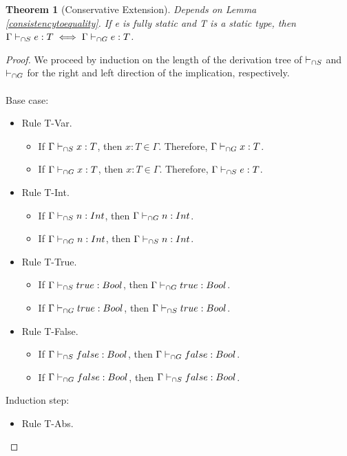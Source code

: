 \documentclass[a4paper]{article}
\newtheorem{theorem}{Theorem}
\begin{document}
\begin{theorem}[Conservative Extension]
\label{conservative_extension_typesystem}
Depends on Lemma \ref{consistencytoequality}.
If e is fully static and T is a static type, then $\Gamma \vdash_{\cap S} e : T \iff \Gamma \vdash_{\cap G} e : T$.
\end{theorem}
\begin{proof}
We proceed by induction on the length of the derivation tree of $\vdash_{\cap S}$ and $\vdash_{\cap G}$ for the right and left direction of the implication, respectively.\\\\
Base case:
\begin{itemize}
    \item Rule T-Var.
    \begin{itemize}
        \item If $\Gamma \vdash_{\cap S} x : T$, then $x : T \in \Gamma$.
        Therefore, $\Gamma \vdash_{\cap G} x : T$.
        \item If $\Gamma \vdash_{\cap G} x : T$, then $x : T \in \Gamma$.
        Therefore, $\Gamma \vdash_{\cap S} e : T$.
    \end{itemize}
    \item Rule T-Int.
    \begin{itemize}
        \item If $\Gamma \vdash_{\cap S} n : {Int}$, then $\Gamma \vdash_{\cap G} n : {Int}$.
        \item If $\Gamma \vdash_{\cap G} n : {Int}$, then $\Gamma \vdash_{\cap S} n : {Int}$.
    \end{itemize}
    \item Rule T-True.
    \begin{itemize}
        \item If $\Gamma \vdash_{\cap S} true : Bool$, then $\Gamma \vdash_{\cap G} true : Bool$.
        \item If $\Gamma \vdash_{\cap G} true : Bool$, then $\Gamma \vdash_{\cap S} true : Bool$.
    \end{itemize}
    \item Rule T-False.
    \begin{itemize}
        \item If $\Gamma \vdash_{\cap S} false : Bool$, then $\Gamma \vdash_{\cap G} false : Bool$.
        \item If $\Gamma \vdash_{\cap G} false : Bool$, then $\Gamma \vdash_{\cap S} false : Bool$.
    \end{itemize}
\end{itemize}
Induction step:
\begin{itemize}
    \item Rule T-Abs.
    \begin{itemize}

\end{itemize}
\end{itemize}
\end{proof}
\end{document}
